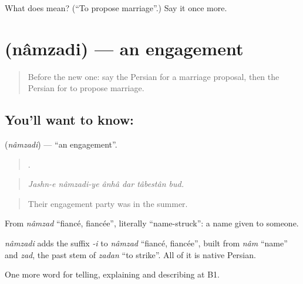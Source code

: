 \begin{tcolorbox}[breakable,colback=teal!4,colframe=teal!35!black,title={Before you move on}]
What does   mean? (\textquotedblleft{}To propose marriage\textquotedblright{}.) Say it once more.
\end{tcolorbox}
\section[\texorpdfstring{\fa{نامزدی} (nâmzadi)}{نامزدی (nâmzadi)}]{ (nâmzadi) — an engagement}

\label{lesson:FA-C334-namzadi}



\begin{quote}
Before the new one: say the Persian for a marriage proposal, then the Persian for to propose marriage.
\end{quote}

\subsection*{You'll want to know: }
\textbf{} (\emph{nâmzadi}) — \textquotedblleft{}an engagement\textquotedblright{}.

\begin{quote}
     .
\end{quote}

\begin{quote}
\emph{Jashn-e nâmzadi-ye ânhâ dar tâbestân bud.}
\end{quote}

\begin{quote}
Their engagement party was in the summer.
\end{quote}

From \emph{nâmzad} \textquotedblleft{}fiancé, fiancée\textquotedblright{}, literally \textquotedblleft{}name-struck\textquotedblright{}: a name given to someone.

\begin{cousinweb}
\emph{nâmzadi} adds the suffix \emph{-i} to \emph{nâmzad} \textquotedblleft{}fiancé, fiancée\textquotedblright{}, built from \emph{nâm} \textquotedblleft{}name\textquotedblright{} and \emph{zad}, the past stem of \emph{zadan} \textquotedblleft{}to strike\textquotedblright{}. All of it is native Persian.
\end{cousinweb}

\begin{grammarlens}[title={What you've built}]
One more word for telling, explaining and describing at B1.
\end{grammarlens}

